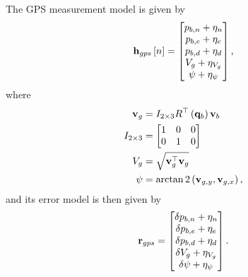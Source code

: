 \documentclass[english]{article}
\begin{document}
The GPS measurement model is given by
\begin{equation}
{\bf{h}}_{gps}\left[n\right] = \begin{bmatrix} p_{b,n} + \eta_n \\ p_{b,e} + \eta_e \\ p_{b,d} + \eta_d \\ V_g + \eta_{V_g} \\ \psi + \eta_{\psi} \end{bmatrix},
\end{equation}
where 
\begin{align}
{\bf v}_g & =  I_{2\times3}R^\top \left({\bf q}_b\right){\bf v}_b \\
I_{2\times3} & = \begin{bmatrix} 1 & 0 & 0 \\ 0 & 1 & 0 \end{bmatrix} \\
V_g & = \sqrt{{\bf v}_g^\top {\bf v}_g} \\
\psi & = \arctan2\left({\bf v}_{g,y}, {\bf v}_{g,x}\right),
\end{align}
and its error model is then given by
\begin{equation}
{\bf r}_{gps} = \begin{bmatrix} \delta p_{b,n} + \eta_n \\ \delta p_{b,e} + \eta_e \\ \delta p_{b,d} + \eta_d \\ \delta V_g + \eta_{V_g} \\ \delta \psi + \eta_{\psi} \end{bmatrix}.
\end{equation}
\end{document}
